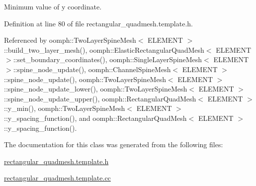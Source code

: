 Minimum value of y coordinate. 



Definition at line 80 of file rectangular\+\_\+quadmesh.\+template.\+h.



Referenced by oomph\+::\+Two\+Layer\+Spine\+Mesh$<$ E\+L\+E\+M\+E\+N\+T $>$\+::build\+\_\+two\+\_\+layer\+\_\+mesh(), oomph\+::\+Elastic\+Rectangular\+Quad\+Mesh$<$ E\+L\+E\+M\+E\+N\+T $>$\+::set\+\_\+boundary\+\_\+coordinates(), oomph\+::\+Single\+Layer\+Spine\+Mesh$<$ E\+L\+E\+M\+E\+N\+T $>$\+::spine\+\_\+node\+\_\+update(), oomph\+::\+Channel\+Spine\+Mesh$<$ E\+L\+E\+M\+E\+N\+T $>$\+::spine\+\_\+node\+\_\+update(), oomph\+::\+Two\+Layer\+Spine\+Mesh$<$ E\+L\+E\+M\+E\+N\+T $>$\+::spine\+\_\+node\+\_\+update\+\_\+lower(), oomph\+::\+Two\+Layer\+Spine\+Mesh$<$ E\+L\+E\+M\+E\+N\+T $>$\+::spine\+\_\+node\+\_\+update\+\_\+upper(), oomph\+::\+Rectangular\+Quad\+Mesh$<$ E\+L\+E\+M\+E\+N\+T $>$\+::y\+\_\+min(), oomph\+::\+Two\+Layer\+Spine\+Mesh$<$ E\+L\+E\+M\+E\+N\+T $>$\+::y\+\_\+spacing\+\_\+function(), and oomph\+::\+Rectangular\+Quad\+Mesh$<$ E\+L\+E\+M\+E\+N\+T $>$\+::y\+\_\+spacing\+\_\+function().



The documentation for this class was generated from the following files\+:\begin{DoxyCompactItemize}
\item 
\hyperlink{rectangular__quadmesh_8template_8h}{rectangular\+\_\+quadmesh.\+template.\+h}\item 
\hyperlink{rectangular__quadmesh_8template_8cc}{rectangular\+\_\+quadmesh.\+template.\+cc}\end{DoxyCompactItemize}

